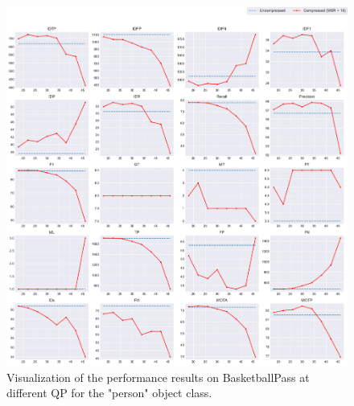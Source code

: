 \begin{figure}[!tb]
  \centering
  \includegraphics[width=1.0\linewidth]{img/BasketballPass_0_multiplots_qp.pdf}
  \caption[Visualization of the performance results on BasketballPass at different QP for the "person" object class]
  {Visualization of the performance results on BasketballPass at different QP for the "person" object class.
  }
  \label{fig:BasketballPass_0_multiplots_qp}
\end{figure}